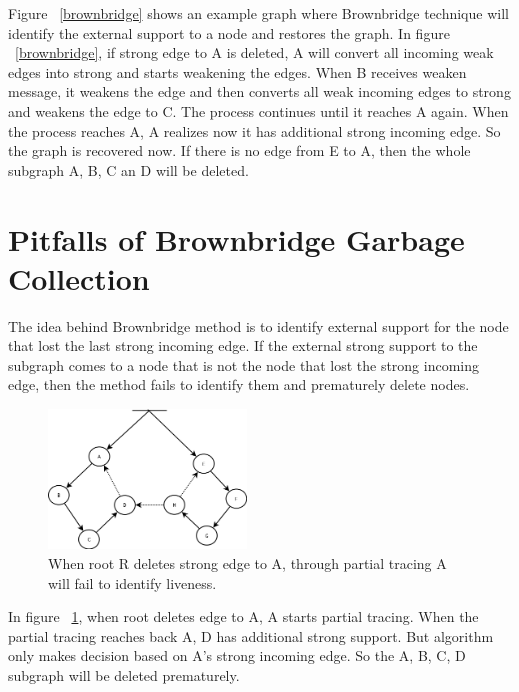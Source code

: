 Figure ~\ref{brownbridge} shows an example graph where Brownbridge technique will identify the external support to a node and restores the graph. In figure ~\ref{brownbridge}, if strong edge to A is deleted, A will convert all incoming weak edges into strong and starts weakening the edges. When B receives weaken message, it weakens the edge and then converts all weak incoming edges to strong and weakens the edge to C. The process continues until it reaches A again. When the process reaches A, A realizes now it has additional strong incoming edge. So the graph is recovered now. If there is no edge from E to A, then the whole subgraph A, B, C an D will be deleted.


\section{Pitfalls of Brownbridge Garbage Collection}
The idea behind Brownbridge method is to identify external support for the node that lost the last strong incoming edge. If the external strong support to the subgraph comes to a node that is not the node that lost the strong incoming edge, then the method fails to identify them and prematurely delete nodes.  

\begin{figure}[!t]
\centering
\includegraphics[width=0.47\textwidth]{figs/brownbridgefail}
\caption{When root R deletes strong edge to A, through partial tracing A will fail to identify liveness.}
\label{brownbridgefail}
\end{figure}

In figure ~\ref{brownbridgefail}, when root deletes edge to A, A starts partial tracing. When the partial tracing reaches back A, D has additional strong support. But algorithm only makes decision based on A's strong incoming edge. So the A, B, C, D subgraph will be deleted prematurely.


